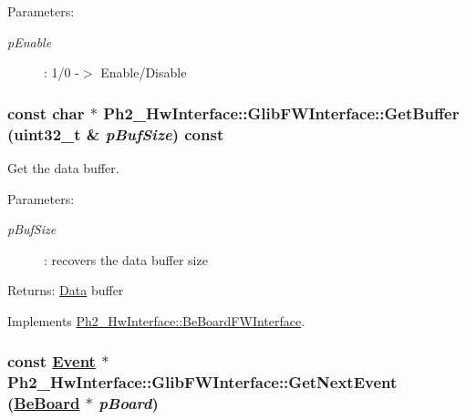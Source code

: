 \begin{Desc}
\item[Parameters:]
\begin{description}
\item[{\em p\-Enable}]: 1/0 -$>$ Enable/Disable \end{description}
\end{Desc}
\hypertarget{class_ph2___hw_interface_1_1_glib_f_w_interface_fecc24a91ec1551bca53589994dd62d2}{
\subsubsection[GetBuffer]{\setlength{\rightskip}{0pt plus 5cm}const char $\ast$ Ph2\_\-Hw\-Interface::Glib\-FWInterface::Get\-Buffer (uint32\_\-t \& {\em p\-Buf\-Size}) const}}
\label{class_ph2___hw_interface_1_1_glib_f_w_interface_fecc24a91ec1551bca53589994dd62d2}


Get the data buffer. 

\begin{Desc}
\item[Parameters:]
\begin{description}
\item[{\em p\-Buf\-Size}]: recovers the data buffer size \end{description}
\end{Desc}
\begin{Desc}
\item[Returns:]\hyperlink{class_ph2___hw_interface_1_1_data}{Data} buffer \end{Desc}


Implements \hyperlink{class_ph2___hw_interface_1_1_be_board_f_w_interface_1a6443a82393e05a60d6d11dd117803a}{Ph2\_\-Hw\-Interface::Be\-Board\-FWInterface}.\hypertarget{class_ph2___hw_interface_1_1_glib_f_w_interface_091f683a54134b92837344da3b3e6eae}{
\subsubsection[GetNextEvent]{\setlength{\rightskip}{0pt plus 5cm}const \hyperlink{class_ph2___hw_interface_1_1_event}{Event} $\ast$ Ph2\_\-Hw\-Interface::Glib\-FWInterface::Get\-Next\-Event (\hyperlink{class_ph2___hw_description_1_1_be_board}{Be\-Board} $\ast$ {\em p\-Board})}}
\label{class_ph2___hw_interface_1_1_glib_f_w_interface_091f683a54134b92837344da3b3e6eae}


